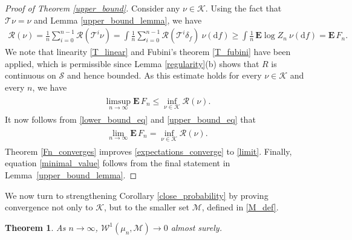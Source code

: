 \documentclass[11pt,reqno]{amsart}
\numberwithin{equation}{section}
\newtheorem{thm}{Theorem}[section]
\theoremstyle{definition}
\begin{document}
\begin{proof}[Proof of Theorem \ref{upper_bound}]
Consider any $\nu \in {\mathcal{K}}$.
Using the fact that ${\mathcal{T}}\nu = \nu$ and Lemma \ref{upper_bound_lemma}, we have
{\begin{align*} {
{\mathcal{R}}(\nu) = \frac{1}{n} \sum_{i = 0}^{n-1} {\mathcal{R}}({\mathcal{T}}^i \nu)
= \int \frac{1}{n} \sum_{i = 0}^{n-1} {\mathcal{R}}({\mathcal{T}}^i\delta_f)\ \nu({\mathrm{d}} f)
\geq \int \frac{1}{n}\, {\mathbf{E}} \log Z_n\ \nu({\mathrm{d}} f)
= {\mathbf{E}}\, F_n.
} \end{align*}}
We note that linearity \eqref{T_linear} and Fubini's theorem \eqref{T_fubini} have been applied, which is permissible since Lemma \ref{regularity}(b) shows that $R$ is continuous on ${\mathcal{S}}$ and hence bounded.
As this estimate holds for every $\nu \in {\mathcal{K}}$ and every $n$, we have
{\begin{align} \begin{split} {
\limsup_{n \to \infty} {\mathbf{E}}\, F_n \leq \inf_{\nu \in {\mathcal{K}}} {\mathcal{R}}(\nu). \label{upper_bound_eq}
} \end{split} \end{align}}
It now follows from \eqref{lower_bound_eq} and \eqref{upper_bound_eq} that
{\begin{align} \begin{split} {
\lim_{n \to \infty} {\mathbf{E}}\, F_n = \inf_{\nu \in {\mathcal{K}}} {\mathcal{R}}(\nu). \label{expectations_converge}
} \end{split} \end{align}}
Theorem \ref{Fn_converges} improves \eqref{expectations_converge} to \eqref{limit}.
Finally, equation \eqref{minimal_value} follows from the final statement in Lemma~\ref{upper_bound_lemma}.
\end{proof}

We now turn to strengthening Corollary \ref{close_probability} by proving convergence not only to ${\mathcal{K}}$, but to the smaller set ${\mathcal{M}}$, defined in \eqref{M_def}.

\begin{thm} \label{close_M}
As $n \to \infty$, ${\mathcal{W}}^1(\mu_n,{\mathcal{M}}) \to 0$ almost surely.
\end{thm}
\end{document}
